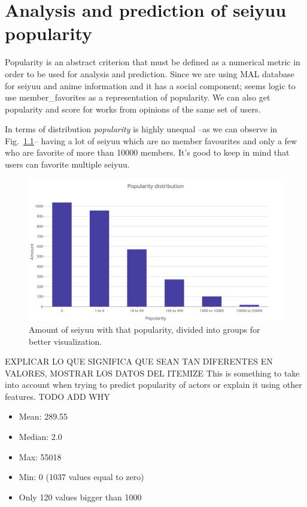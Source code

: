 \chapter{Analysis and prediction of seiyuu popularity}

Popularity is an abstract criterion that must be defined as a numerical metric in order to be used for analysis and prediction. Since we are using MAL database for seiyuu and anime information and it has a social component; seems logic to use member\_favorites as a representation of popularity. We can also get popularity and score for works from opinions of the same set of users.

In terms of distribution \textit{popularity} is highly unequal \---as we can observe in Fig.~\ref{fig:popularityDistribution}\--- having a lot of seiyuu which are no member favourites and only a few who are favorite of more than 10000 members. It's good to keep in mind that users can favorite multiple seiyuu.

\begin{figure}[!hbt]
	\begin{center}
	\includegraphics[width=\columnwidth]{graphics/popularityDistribution.png}
	\caption{Amount of seiyuu with that popularity, divided into groups for better visualization.}
	\label{fig:popularityDistribution}
	\end{center}
\end{figure}

EXPLICAR LO QUE SIGNIFICA QUE SEAN TAN DIFERENTES EN VALORES, MOSTRAR LOS DATOS DEL ITEMIZE
This is something to take into account when trying to predict popularity of actors or explain it using other features. TODO ADD WHY

\begin{itemize}
	\item Mean:    289.55
	\item Median:    2.0
	\item Max:    55018
	\item Min:    0 (1037 values equal to zero)
	\item Only 120 values bigger than 1000
\end{itemize}

